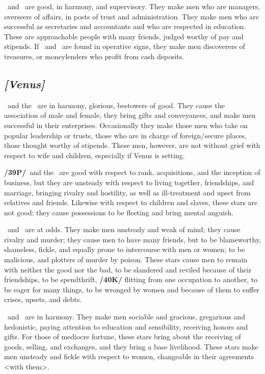 \Jupiter\, and \Mercury\, are good, in harmony, and supervisory. They make men who are managers, overseers of affairs, in posts of trust and administration. They make men who are successful as secretaries and accountants and who are respected in education. These are approachable people with many friends, judged worthy of pay and stipends. If \Jupiter\, and \Mercury\, are found in operative signs, they make men
discoverers of treasures, or moneylenders who profit from cash deposits.

\secbr
{}
\subsection{\textit{[Venus]}}
\Venus\, and the \Sun\, are in harmony, glorious, bestowers of good. They cause the association of male and female, they bring gifts and conveyances, and make men successful in their enterprises. Occasionally they make those men who take on popular leadership or trusts, those who are in charge of foreign/secure places, those thought worthy of stipends. These men, however, are not without grief with respect to wife and children, especially if Venus is setting.

\textbf{/39P/}\Venus\, and the \Moon\, are good with respect to rank, acquisitions, and the inception of business,
but they are unsteady with respect to living together, friendships, and marriage, bringing rivalry and hostility, as well as ill-treatment and upset from relatives and friends. Likewise with respect to children and slaves, these stars are not good: they cause possessions to be fleeting and bring mental anguish.

\Venus\, and \Mars\, are at odds. They make men unsteady and weak of mind; they cause rivalry and murder; they cause men to have many friends, but to be blameworthy, shameless, fickle, and equally prone to intercourse with men or women; to be malicious, and plotters of murder by poison. These stars cause men to remain with neither the good nor the bad, to be slandered and reviled because of their friendships, to
be spendthrift, \textbf{/40K/} flitting from one occupation to another, to be eager for many things, to be wronged by women and because of them to suffer crises, upsets, and debts.

\Venus\, and \Mercury\, are in harmony. They make men sociable and gracious, gregarious and hedonistic, paying attention to education and sensibility, receiving honors and gifts. For those of mediocre fortune, these stars bring about the receiving of goods, selling, and exchanges, and they bring a base livelihood. These stars make men unsteady and fickle with respect to women, changeable in their agreements <with
them>.

